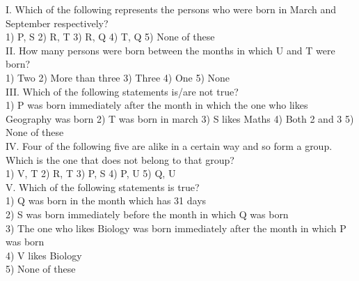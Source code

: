 \documentclass[
]{article}
\begin{document}
I. Which of the following represents the persons who were born in March and September
respectively?\\
1) P, S \hspace{2mm}2) R, T \hspace{2mm}3) R, Q \hspace{2mm}4) T, Q \hspace{2mm}5) None of these\\

II. How many persons were born between the months in which U and T were born?\\
1) Two \hspace{2mm}2) More than three \hspace{2mm}3) Three \hspace{2mm}4) One \hspace{2mm}5) None\\

III. Which of the following statements is/are not true?\\
1) P was born immediately after the month in which the one who likes Geography was
born
\hspace{2mm}2) T was born in march \hspace{2mm}3) S likes Maths
\hspace{2mm}4) Both 2 and 3 \hspace{2mm}5) None of these\\

IV. Four of the following five are alike in a certain way and so form a group. Which is the one
that does not belong to that group?\\
1) V, T \hspace{2mm}2) R, T \hspace{2mm}3) P, S \hspace{2mm}4) P, U \hspace{2mm}5) Q, U\\

V. Which of the following statements is true?\\
1) Q was born in the month which has 31 days\\
2) S was born immediately before the month in which Q was born\\
3) The one who likes Biology was born immediately after the month in which P was born\\
4) V likes Biology\\
5) None of these\\
\end{document}
